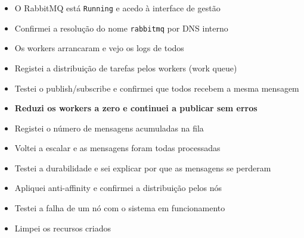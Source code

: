\documentclass[11pt,a4paper]{article}
\begin{document}
\begin{itemize}
  \item[$\square$] O RabbitMQ está \texttt{Running} e acedo à interface de gestão
  \item[$\square$] Confirmei a resolução do nome \texttt{rabbitmq} por DNS interno
  \item[$\square$] Os workers arrancaram e vejo os logs de todos
  \item[$\square$] Registei a distribuição de tarefas pelos workers (work queue)
  \item[$\square$] Testei o publish/subscribe e confirmei que todos recebem a mesma mensagem
  \item[$\square$] \textbf{Reduzi os workers a zero e continuei a publicar sem erros}
  \item[$\square$] Registei o número de mensagens acumuladas na fila
  \item[$\square$] Voltei a escalar e as mensagens foram todas processadas
  \item[$\square$] Testei a durabilidade e sei explicar por que as mensagens se perderam
  \item[$\square$] Apliquei anti-affinity e confirmei a distribuição pelos nós
  \item[$\square$] Testei a falha de um nó com o sistema em funcionamento
  \item[$\square$] Limpei os recursos criados
\end{itemize}
\end{document}
